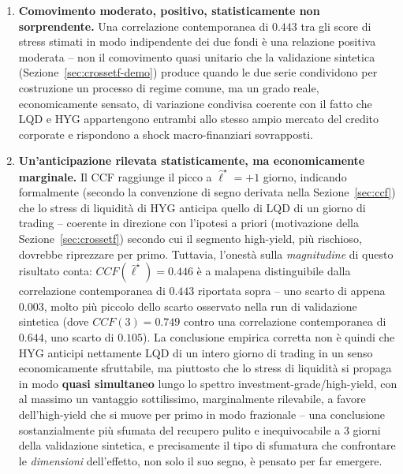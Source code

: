 \documentclass[11pt]{article}
\theoremstyle{definition}
\theoremstyle{remark}
\begin{document}
\begin{enumerate}
    \item \textbf{Comovimento moderato, positivo, statisticamente non sorprendente.} Una correlazione contemporanea di $0.443$ tra gli score di stress stimati in modo indipendente dei due fondi \`e una relazione positiva moderata -- non il comovimento quasi unitario che la validazione sintetica (Sezione~\ref{sec:crossetf-demo}) produce quando le due serie condividono per costruzione un processo di regime comune, ma un grado reale, economicamente sensato, di variazione condivisa coerente con il fatto che LQD e HYG appartengono entrambi allo stesso ampio mercato del credito corporate e rispondono a shock macro-finanziari sovrapposti.
    \item \textbf{Un'anticipazione rilevata statisticamente, ma economicamente marginale.} Il CCF raggiunge il picco a $\widehat\ell^\star=+1$ giorno, indicando formalmente (secondo la convenzione di segno derivata nella Sezione~\ref{sec:ccf}) che lo stress di liquidit\`a di HYG anticipa quello di LQD di un giorno di trading -- coerente in direzione con l'ipotesi a priori (motivazione della Sezione~\ref{sec:crossetf}) secondo cui il segmento high-yield, pi\`u rischioso, dovrebbe riprezzare per primo. Tuttavia, l'onest\`a sulla \emph{magnitudine} di questo risultato conta: $CCF(\widehat\ell^\star)=0.446$ \`e a malapena distinguibile dalla correlazione contemporanea di $0.443$ riportata sopra -- uno scarto di appena $0.003$, molto pi\`u piccolo dello scarto osservato nella run di validazione sintetica (dove $CCF(3)=0.749$ contro una correlazione contemporanea di $0.644$, uno scarto di $0.105$). La conclusione empirica corretta non \`e quindi che HYG anticipi nettamente LQD di un intero giorno di trading in un senso economicamente sfruttabile, ma piuttosto che lo stress di liquidit\`a si propaga in modo \textbf{quasi simultaneo} lungo lo spettro investment-grade/high-yield, con al massimo un vantaggio sottilissimo, marginalmente rilevabile, a favore dell'high-yield che si muove per primo in modo frazionale -- una conclusione sostanzialmente pi\`u sfumata del recupero pulito e inequivocabile a 3 giorni della validazione sintetica, e precisamente il tipo di sfumatura che confrontare le \emph{dimensioni} dell'effetto, non solo il suo segno, \`e pensato per far emergere.

\end{enumerate}
\end{document}
